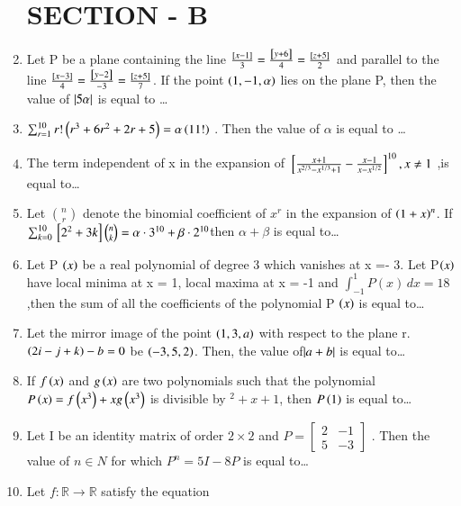 \documentclass[journal,12pt,twocolumn]{IEEEtran}
\theoremstyle{remark}
\begin{document}
\begin{enumerate}[start=16]
\section{SECTION - B}
\item Let P be a plane containing the line $
\frac{{}\left[x - 1\right]}{3} = \frac{{}\left[y + 6\right]}{4} = \frac{{}\left[z + 5\right]}{2} $ and parallel to the line $
		\frac{{}\left[x - 3\right]}{4} = \frac{{}\left[y - 2\right]}{-3} = \frac{{}\left[z + 5\right]}{7} $. If the point $\left(1,-1,\alpha\right)$ lies on the plane P, then the value of $\left\vert5\alpha\right\vert$ is equal to \dots
\hfill{}
	\item $\sum_{r=1}^{10} r!\left( r^3 + 6r^2 + 2r + 5 \right) = \alpha \left(11!\right)$ . Then the value of $\alpha$ is equal to \dots
\hfill{}
	\item The term independent of x in the expansion of $
{}\left[ \frac{x + 1}{x^{2/3} - x^{1/3} + 1} - \frac{x - 1}{x - x^{1/2}} \right]^{10} , x \neq 1$ ,is equal to\dots
\hfill{}
\item  Let $ \binom{n}{r} $ denote the binomial coefficient of $ x^r $ in the expansion of $ \left(1+x\right)^n $. If $    \sum_{k=0}^{10} {}\left[2^2 + 3k\right] \binom{n}{k} = \alpha \cdot 3^{10} + \beta \cdot 2^{10}$then $\alpha + \beta$ is equal to\dots
\hfill{}
\item  Let P $\left(x\right)$ be a real polynomial of degree 3 which vanishes at x =- 3. Let P$\left(x\right)$ have local minima at x = 1, local maxima at x = -1 and $\int_{-1}^{1} P(x) \, dx = 18$,then the sum of all the coefficients of the polynomial P $\left(x\right)$ is equal to\dots
\hfill{}
\item   Let the mirror image of the point $\left(1, 3, a\right)$ with respect to the plane r. $\left(2i - j + k\right) - b = 0$ be $\left(-3, 5, 2\right)$. Then, the value of$ \left\vert a + b\right\vert$ is equal to\dots
\hfill{}
\item If $f\left(x\right)$ and $g\left(x\right)$ are two polynomials such that the polynomial $P \left(x\right) = f \left(x^3\right) + x g \left(x^3\right)$ is divisible by $^2 + x + 1$, then $P \left(1\right)$ is equal to\dots
\hfill{}
\item  Let I be an identity matrix of order $2 \times 2$  and $
P = \begin{bmatrix} 
2 & -1 \\ 
5 & -3 
\end{bmatrix}
$ . Then the value of $n\in N$ for which $P^n=5I-8P$ is equal to\dots
\hfill{}
\item Let  $f : \mathbb{R} \to \mathbb{R}$ satisfy the equation 

\end{enumerate}
\end{document}
